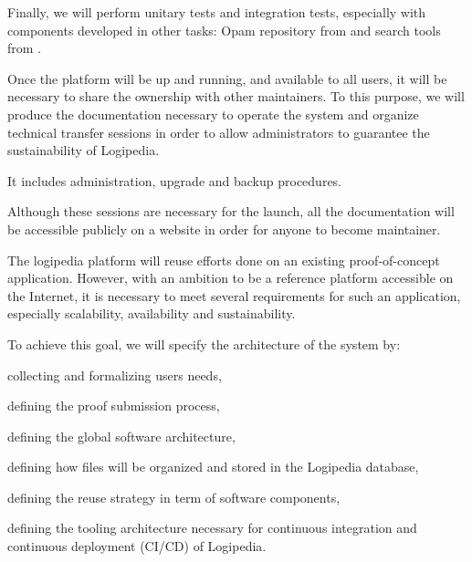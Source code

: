\begin{workpackage}[id=access,type=RTD,wphases=1-48,
  short=Access,%
  title={Access},
  lead=Inr,InrRM=48,OcaRM=6,EduRM=12]
\begin{tasklist}
{\begin{task}[id=web,
      title=Giving access to the infrastructure on the world-wide web,
      lead=Inr,InrRM=18,,wphases=8-27]
    Finally, we will perform unitary tests and integration tests,
    especially with components developed in other tasks: Opam
    repository from  and search tools from
    .
  \end{task}

  \begin{task}[id=transfer,
      title=Transfer for the sustainability of the system,
      lead=Inr,InrRM=1,wphases=28-29]
    Once the platform will be up and running, and available to all
    users, it will be necessary to share the ownership with other
    maintainers. To this purpose, we will produce the documentation
    necessary to operate the system and organize technical transfer
    sessions in order to allow administrators to guarantee the
    sustainability of Logipedia.

    It includes administration, upgrade and backup procedures.

    Although these sessions are necessary for the launch, all the
    documentation will be accessible publicly on a website in order
    for anyone to become maintainer.
  \end{task}
  }

  \begin{task}[id=archi,
      title=Setting up the hardware and software architecture,
      lead=Inr,InrRM=6,wphases=1-6]
    The logipedia platform will reuse efforts done on an existing
    proof-of-concept application. However, with an ambition to be a
    reference platform accessible on the Internet, it is necessary to meet
    several requirements for such an application, especially
    scalability, availability and sustainability.

    To achieve this goal, we will specify the architecture of the system by:
    \begin{compactitem}
    \item collecting and formalizing users needs,
    \item defining the proof submission process,
    \item defining the global software architecture,
    \item defining how files will be organized and stored in the
      Logipedia database,
    \item defining the reuse strategy in term of software components,
    \item defining the tooling architecture necessary for continuous
      integration and continuous deployment (CI/CD) of Logipedia.
    \end{compactitem}


\end{task}
\end{tasklist}
\end{workpackage}
